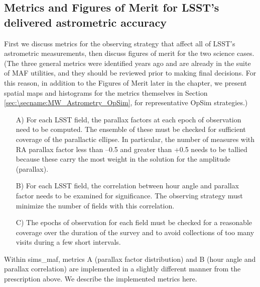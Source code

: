 


\subsection{Metrics and Figures of Merit for LSST's delivered astrometric accuracy}
\label{sec:\secname:MW_Astrometry_metrics}


First we discuss metrics for the observing strategy that affect all of
LSST's astrometric measurements, then discuss figures of merit for the
two science cases. (The three general metrics were identified years
ago and are already in the suite of MAF utilities, and they should be
reviewed prior to making final decisions. For this reason, in addition
to the Figures of Merit later in the chapter, we present spatial maps
and histograms for the metrics themselves in Section
\ref{sec:\secname:MW_Astrometry_OpSim}, for representative OpSim
strategies.)

\begin{itemize}
\item[A)] For each LSST field, the parallax factors at each epoch of
observation need to be computed.  The ensemble of these must be checked for
sufficient coverage of the parallactic ellipse.  In particular, the number of
measures with RA parallax factor less than --0.5 and greater than +0.5
needs to be tallied because these carry the most weight in the solution
for the amplitude (parallax).
\item[B)] For each LSST field,
the correlation between hour angle and parallax factor
needs to be examined for significance.  The observing strategy must minimize
the number of fields with this correlation.
\item[C)] The epochs of observation for each field must be checked for a
reasonable coverage over the duration of the survey and to avoid
collections of too many visits during a few short intervals.
\end{itemize}

Within sims\_maf, metrics A (parallax factor distribution) and B
  (hour angle and parallax correlation) are implemented in a slightly
  different manner from the prescription above. We describe the
  implemented metrics here.

